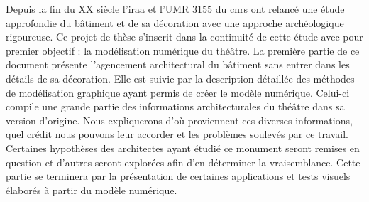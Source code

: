 			 
			 Depuis la fin du XX siècle l'\gls{iraa} et l'UMR 3155 du \gls{cnrs} ont relancé une étude approfondie du bâtiment et de sa décoration avec une approche archéologique rigoureuse. Ce projet de thèse s'inscrit dans la continuité de cette étude avec pour premier objectif : la modélisation numérique du théâtre. La première partie de ce document présente l'agencement architectural du bâtiment sans entrer dans les détails de sa décoration. Elle est suivie par la description détaillée des méthodes de modélisation graphique ayant permis de créer le modèle numérique. Celui-ci compile une grande partie des informations architecturales du théâtre dans sa version d'origine. Nous expliquerons d'où proviennent ces diverses informations, quel crédit nous pouvons leur accorder et les problèmes soulevés par ce travail. Certaines hypothèses des architectes ayant étudié ce monument seront remises en question et d'autres seront explorées afin d'en déterminer la vraisemblance. Cette partie se terminera par la présentation de certaines applications et tests visuels élaborés à partir du modèle numérique.
			 
